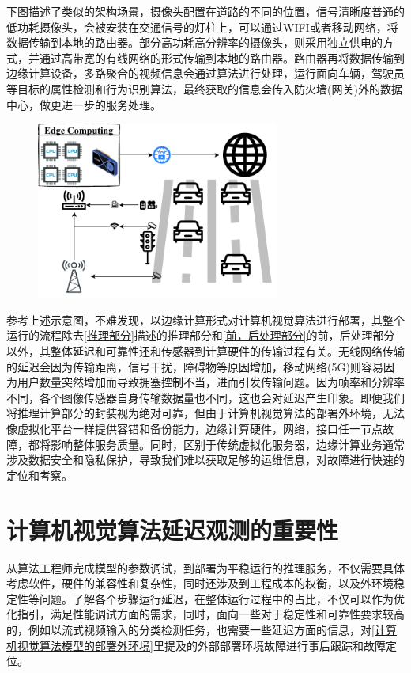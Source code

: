 \documentclass[master,anonymous]{shtthesis}
\begin{document}
下图描述了类似的架构场景，摄像头配置在道路的不同的位置，信号清晰度普通的低功耗摄像头，会被安装在交通信号的灯柱上，可以通过WIFI或者移动网络，将数据传输到本地的路由器。部分高功耗高分辨率的摄像头，则采用独立供电的方式，并通过高带宽的有线网络的形式传输到本地的路由器。路由器再将数据传输到边缘计算设备，多路聚合的视频信息会通过算法进行处理，运行面向车辆，驾驶员等目标的属性检测和行为识别算法，最终获取的信息会传入防火墙(网关)外的数据中心，做更进一步的服务处理。

\begin{figure}[H]
	\centering
	\includegraphics[width=8cm]{img/trafic.pdf}
	\label{交通场景的边缘计算部署}
\end{figure}

参考上述示意图，不难发现，以边缘计算形式对计算机视觉算法进行部署，其整个运行的流程除去\ref{推理部分}描述的推理部分和\ref{前，后处理部分}的前，后处理部分以外，其整体延迟和可靠性还和传感器到计算硬件的传输过程有关。无线网络传输的延迟会因为传输距离，信号干扰，障碍物等原因增加，移动网络(5G)则容易因为用户数量突然增加而导致拥塞控制不当，进而引发传输问题。因为帧率和分辨率不同，各个图像传感器自身传输数据量也不同，这也会对延迟产生印象。即便我们将推理计算部分的封装视为绝对可靠，但由于计算机视觉算法的部署外环境，无法像虚拟化平台一样提供容错和备份能力，边缘计算硬件，网络，接口任一节点故障，都将影响整体服务质量。同时，区别于传统虚拟化服务器，边缘计算业务通常涉及数据安全和隐私保护，导致我们难以获取足够的运维信息，对故障进行快速的定位和考察。

\section{计算机视觉算法延迟观测的重要性}\label{计算机视觉算法延迟观测的重要性}
从算法工程师完成模型的参数调试，到部署为平稳运行的推理服务，不仅需要具体考虑软件，硬件的兼容性和复杂性，同时还涉及到工程成本的权衡，以及外环境稳定性等问题。了解各个步骤运行延迟，在整体运行过程中的占比，不仅可以作为优化指引，满足性能调试方面的需求，同时，面向一些对于稳定性和可靠性要求较高的，例如以流式视频输入的分类检测任务，也需要一些延迟方面的信息，对\ref{计算机视觉算法模型的部署外环境}里提及的外部部署环境故障进行事后跟踪和故障定位。
\end{document}
